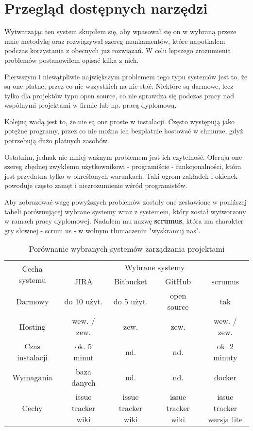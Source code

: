 \section{Przegląd dostępnych narzędzi}
Wytwarzając ten system skupiłem się, aby wpasował się on w wybraną przeze mnie metodykę oraz rozwiązywał szereg mankamentów, które napotkałem podczas korzystania z obecnych już rozwiązań. W celu lepszego zrozumienia problemów postanowiłem opisać kilka z nich.

Pierwszym i niewątpliwie największym problemem tego typu systemów jest to, że są one płatne, przez co nie wszystkich na nie stać. Niektóre są darmowe, lecz tylko dla projektów typu open source, co nie sprawdza się podczas pracy nad wspólnymi projektami w firmie lub np. pracą dyplomową.

Kolejną wadą jest to, że nie są one proste w instalacji. Często występują jako potężne programy, przez co nie można ich bezpłatnie hostować w chmurze, gdyż potrzebują dużo płatnych zasobów. 

Ostatnim, jednak nie mniej ważnym problemem jest ich czytelność. Oferują one szereg zbędnej zwykłemu użytkownikowi - programiście - funkcjonalności, która jest przydatna tylko w określonych warunkach. Taki ogrom zakładek i okienek powoduje często zamęt i niezrozumienie wśród programistów.

Aby zobrazować wagę powyższych problemów zostały one zestawione w poniższej tabeli porównującej wybrane systemy wraz z systemem, który został wytworzony w ramach pracy dyplomowej. Nadałem mu nazwę \textbf{scrumus}, która ma charakter gry słownej - scrum us - w wolnym tłumaczeniu "wyskramuj nas".
\begin{table}[h!]
	\caption{Porównanie wybranych systemów zarządzania projektami}
	\centering
	\begin{tabular}{|c|c|c|c|c|}
		\hline
		\multirow{2}{*}{Cecha systemu} & \multicolumn{4}{c|}{Wybrane systemy} \\\cline{2-5} & JIRA & Bitbucket & GitHub & scrumus\\
		\hline
		Darmowy & do 10 użyt. & do 5 użyt. & open source & tak\\
		\hline
		Hosting & wew. / zew. & zew. & zew. & wew. / zew.\\
		\hline
		Czas instalacji & ok. 5 minut & nd. & nd. & ok. 2 minuty\\
		\hline
		Wymagania & baza danych & nd. & nd. & docker\\
		\hline
		Cechy & \specialcell{issue tracker\\ wiki} & \specialcell{issue tracker\\ wiki} & \specialcell{issue tracker\\ wiki} & \specialcell{issue tracker\\ wersja lite}\\
		\hline
		
	\end{tabular}
	\label{tabela:porownanie_systemow}
\end{table}

